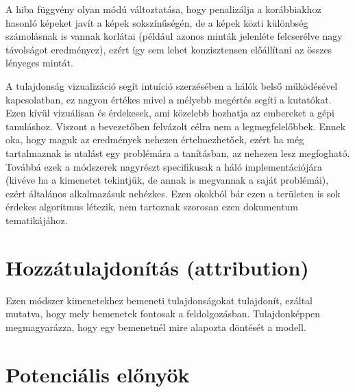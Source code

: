A hiba függvény olyan módú változtatása, hogy penalizálja a korábbiakhoz hasonló képeket javít a képek sokszínűségén, de a képek közti különbség számolásnak is vannak korlátai (például azonos minták jelenléte felcserélve nagy távolságot eredményez), ezért így sem lehet konzisztensen előállítani az összes lényeges mintát.

A tulajdonság vizualizáció segít intuíció szerzésében a hálók belső működésével kapcsolatban, ez nagyon értékes mivel a mélyebb megértés segíti a kutatókat. Ezen kívül vizuálisan és érdekesek, ami közelebb hozhatja az embereket a gépi tanuláshoz. Viszont a bevezetőben felvázolt célra nem a legmegfelelőbbek. Ennek oka, hogy maguk az eredmények nehezen értelmezhetőek, ezért ha még tartalmaznak is utalást egy problémára a tanításban, az nehezen lesz megfogható. Továbbá ezek a módszerek nagyrészt specifikusak a háló implementációjára (kivéve ha a kimenetet tekintjük, de annak is megvannak a saját problémái), ezért általános alkalmazásuk nehézkes. Ezen okokból bár ezen a területen is sok érdekes algoritmus létezik, nem tartoznak szorosan ezen dokumentum tematikájához.

\section{Hozzátulajdonítás (attribution)}

Ezen módszer kimenetekhez bemeneti tulajdonságokat tulajdonít, ezáltal mutatva, hogy mely bemenetek fontosak a feldolgozásban. Tulajdonképpen megmagyarázza, hogy egy bemenetnél mire alapozta döntését a modell.






\section{Potenciális előnyök}
